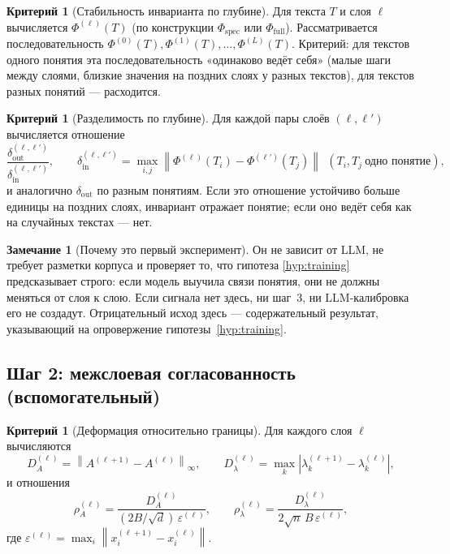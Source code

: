 \documentclass[11pt,a4paper]{article}
\theoremstyle{definition}
\newtheorem{criterion}[definition]{Критерий}
\newtheorem{remark}[definition]{Замечание}
\theoremstyle{plain}
\newcommand{\norm}[1]{\left\lVert #1 \right\rVert}
\newcommand{\abs}[1]{\left\lvert #1 \right\rvert}
\begin{document}
\begin{criterion}[Стабильность инварианта по глубине]
Для текста $T$ и слоя $\ell$ вычисляется $\Phi^{(\ell)}(T)$ (по конструкции
$\Phi_{\mathrm{spec}}$ или $\Phi_{\mathrm{full}}$). Рассматривается последовательность
$\Phi^{(0)}(T),\Phi^{(1)}(T),\dots,\Phi^{(L)}(T)$. Критерий: для текстов одного понятия эта
последовательность «одинаково ведёт себя» (малые шаги между слоями, близкие значения на
поздних слоях у разных текстов), для текстов разных понятий — расходится.
\end{criterion}

\begin{criterion}[Разделимость по глубине]
Для каждой пары слоёв $(\ell,\ell')$ вычисляется отношение
\[
\frac{\delta_{\mathrm{out}}^{(\ell,\ell')}}{\delta_{\mathrm{in}}^{(\ell,\ell')}},
\qquad
\delta_{\mathrm{in}}^{(\ell,\ell')}=\max_{i,j}\norm{\Phi^{(\ell)}(T_i)-\Phi^{(\ell')}(T_j)}\ \ (T_i,T_j\ \text{одно понятие}),
\]
и аналогично $\delta_{\mathrm{out}}$ по разным понятиям. Если это отношение устойчиво
больше единицы на поздних слоях, инвариант отражает понятие; если оно ведёт себя как на
случайных текстах — нет.
\end{criterion}

\begin{remark}[Почему это первый эксперимент]
Он не зависит от LLM, не требует разметки корпуса и проверяет то, что гипотеза
\ref{hyp:training} предсказывает строго: если модель выучила связи понятия, они не должны
меняться от слоя к слою. Если сигнала нет здесь, ни шаг~3, ни LLM-калибровка его не
создадут. Отрицательный исход здесь — содержательный результат, указывающий на
опровержение гипотезы~\ref{hyp:training}.
\end{remark}

\subsection{Шаг 2: межслоевая согласованность (вспомогательный)}\label{sec:level0}

\begin{criterion}[Деформация относительно границы]
Для каждого слоя $\ell$ вычисляются
\[
D_A^{(\ell)}=\norm{A^{(\ell+1)}-A^{(\ell)}}_\infty,\qquad
D_\lambda^{(\ell)}=\max_k\abs{\lambda_k^{(\ell+1)}-\lambda_k^{(\ell)}},
\]
и отношения
\[
\rho_A^{(\ell)}=\frac{D_A^{(\ell)}}{(2B/\sqrt d)\,\varepsilon^{(\ell)}},\qquad
\rho_\lambda^{(\ell)}=\frac{D_\lambda^{(\ell)}}{2\sqrt n\,B\,\varepsilon^{(\ell)}} ,
\]
где $\varepsilon^{(\ell)}=\max_i\norm{x_i^{(\ell+1)}-x_i^{(\ell)}}$.
\end{criterion}
\end{document}
